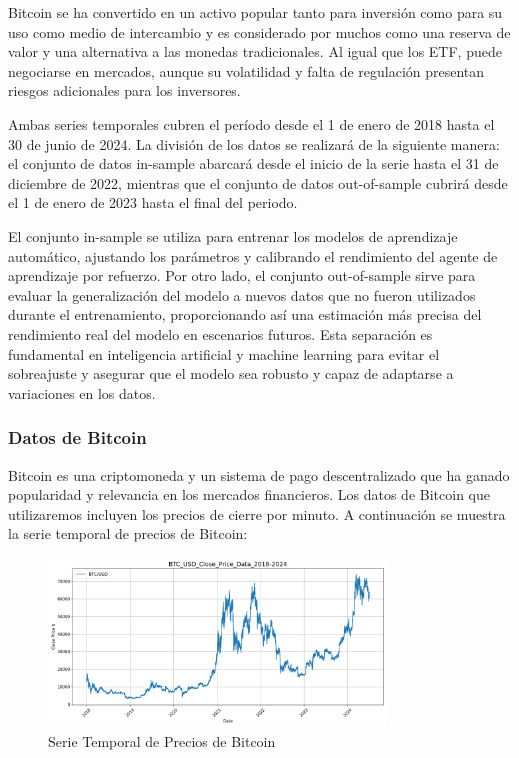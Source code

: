 \documentclass[a4paper,12pt, twoside]{report}
\begin{document}
Bitcoin se ha convertido en un activo popular tanto para inversión como para su uso 
como medio de intercambio y es considerado por muchos como una reserva de valor 
y una alternativa a las monedas tradicionales. Al igual que los ETF, puede negociarse 
en mercados, aunque su volatilidad y falta de regulación presentan riesgos 
adicionales para los inversores.



Ambas series temporales cubren el período desde el 
1 de enero de 2018 hasta el 30 de junio de 2024. La división de los datos se realizará de la 
siguiente manera: el conjunto de datos in-sample abarcará desde el inicio de la serie hasta 
el 31 de diciembre de 2022, mientras que el conjunto de datos out-of-sample cubrirá desde el 
1 de enero de 2023 hasta el final del periodo.

El conjunto in-sample se utiliza para entrenar los modelos de aprendizaje automático, 
ajustando los parámetros y calibrando el rendimiento del agente de aprendizaje por refuerzo. 
Por otro lado, el conjunto out-of-sample sirve para evaluar la generalización del modelo a 
nuevos datos que no fueron utilizados durante el entrenamiento, proporcionando así una 
estimación más precisa del rendimiento real del modelo en escenarios futuros. Esta separación 
es fundamental en inteligencia artificial y machine learning para evitar el sobreajuste y 
asegurar que el modelo sea robusto y capaz de adaptarse a variaciones en los datos.



\subsubsection{Datos de Bitcoin}

Bitcoin es una criptomoneda y un sistema de pago descentralizado que ha ganado popularidad y relevancia en los mercados financieros. 
Los datos de Bitcoin que utilizaremos incluyen los precios de cierre por minuto. A continuación se muestra la serie temporal de precios 
de Bitcoin:

\begin{figure}[H]
    \centering
    \includegraphics[width=0.8\textwidth]{./figures/BTC_USD_Close_Price_Data_2018-2024.png}
    \caption{Serie Temporal de Precios de Bitcoin}
    \label{fig:bitcoin-prices}
\end{figure}
\end{document}
